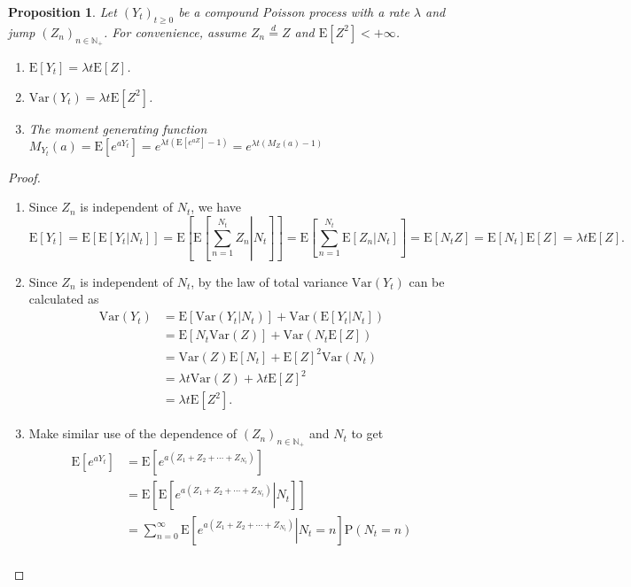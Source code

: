 \documentclass{article}
\newtheorem{proposition}{Proposition}[section]
\theoremstyle{nonumberplain}
\newtheorem{proof}{Proof.}
\begin{document}
\begin{proposition}
	Let $(Y_t)_{t\ge 0}$ be a compound Poisson process with a rate $\lambda$ and jump $(Z_n)_{n\in \mathbb{N}_+}$. For convenience, assume $Z_n\overset{d}{=}Z$ and $\mathrm{E}[Z^2]<+\infty$.
	\begin{enumerate}
		\item $\mathrm{E}[Y_t]=\lambda t\mathrm{E}[Z]$.
		\item $\mathrm{Var}(Y_t)=\lambda t\mathrm{E}[Z^2]$.
		\item The moment generating function $M_{Y_t}(a)=\mathrm{E}[e^{aY_t}]=e^{\lambda t(\mathrm{E}[e^{aZ}]-1)}=e^{\lambda t(M_Z(a)-1)}$
	\end{enumerate}
\end{proposition}
\begin{proof}\hspace*{1em}	
\begin{enumerate}
	\item Since $Z_n$ is independent of $N_t$, we have $$\mathrm{E}[Y_t]=\mathrm{E}[\mathrm{E}[Y_t|N_t]]=\mathrm{E}\left[\mathrm{E}\left[\left.\sum _{n=1}^{N_t}Z_{n}\right|N_t\right]\right]=\mathrm{E}\left[\sum _{n=1}^{N_t}\mathrm{E}\left[\left.Z_{n}\right|N_t\right]\right]=\mathrm{E}[N_tZ]=\mathrm{E}[N_t]\mathrm{E}[Z]=\lambda t\mathrm{E}[Z].$$
	\item Since $Z_n$ is independent of $N_t$, by the law of total variance $\mathrm{Var}(Y_t)$ can be calculated as
	\begin{align*}
		\mathrm{Var}(Y_t)&=\mathrm{E}[\mathrm{Var}(Y_t|N_t)]+\mathrm{Var}(\mathrm{E}[Y_t|N_t])\\
		&=\mathrm{E}[N_t\mathrm{Var}(Z)]+\mathrm{Var}(N_t\mathrm{E}[Z])\\
		&=\mathrm{Var}(Z)\mathrm{E}[N_t]+\mathrm{E}[Z]^2\mathrm{Var}(N_t)\\
		&=\lambda t\mathrm{Var}(Z)+\lambda t\mathrm{E}[Z]^2\\
		&=\lambda t \mathrm{E}[Z^2].
	\end{align*}
	\item Make similar use of the dependence of $(Z_n)_{n\in\mathbb{N_+}}$ and $N_t$ to get
	\[
	\begin{aligned}
	\mathrm{E}\left[e^{aY_t}\right]&=\mathrm{E}\left[e^{a\left(Z_1+Z_2+\cdots+Z_{N_t}\right)}\right]\\
	&=\mathrm{E}\left[\mathrm{E}\left[\left.e^{a\left(Z_1+Z_2+\cdots+Z_{N_t}\right)}\right|N_t\right]\right]\\
	&=\sum_{n=0}^{\infty}\mathrm{E}\left[\left.e^{a\left(Z_1+Z_2+\cdots+Z_{N_t}\right)}\right|N_t=n\right]\mathrm{P}\left(N_t=n\right)\\

\end{aligned}\]
\end{enumerate}
\end{proof}
\end{document}
